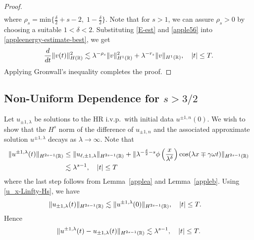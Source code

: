 \begin{proof}
\begin{equation}
\begin{split}
\label{apple56}
\end{split}
\end{equation}
%
%
where $\rho_s = \text{min} \Big\{ \frac{\delta}{2} + s -2, \; 1-
\frac{\delta}{2} \Big\}$.  Note that for $s>1$, we can assure $\rho_s > 0$
by choosing a suitable $1<\delta<2$.
Substituting \eqref{E-est} and \eqref{apple56} into \eqref{appleenergy-estimate-best},
we get
%
%
\begin{equation}
\label{apple58}
\frac{d}{dt} \|v(t)\|_{H(\mathbb{R})}^2 \lesssim \lambda^{-\rho_s}
\|v\|_{H^1(\mathbb{R})}^2 + \lambda^{-r_s}
\|v \|_{H^1(\mathbb{R})}, \quad |t| \le T.
\end{equation}
%
%
Applying Gronwall's inequality completes the proof. 
\end{proof}
%
%
%
%
\subsection{Non-Uniform Dependence for $s>3/2$}
Let $u_{\pm 1,\lambda}$ be solutions to the HR i.v.p.\ with initial 
data $u^{\pm 1,
n}(0)$. We wish to show that the $H^s$ norm of the difference of $u_{\pm 1,
n}$ and the associated approximate solution $u^{\pm 1,\lambda}$
decays as $\lambda \to \infty$. Note that
%
%
\begin{equation*}
\begin{split}
\label{apple62}
\|u^{\pm 1, \lambda}(t)\|_{H^{2s-1}(\mathbb{R})}
& \le \|u_{\ell, \pm 1, \lambda}\|_{H^{2s-1}(\mathbb{R})} +
\| \lambda^{-\frac{\delta}{2} -s} \phi \left(
\frac{x}{\lambda^\delta} \right) \cos(\lambda x \mp \gamma \omega t)
\|_{H^{2s-1}(\mathbb{R})}
\\
& \lesssim \lambda^{s-1}, \quad |t| \le T
\end{split}
\end{equation*}
%
%
where the last step follows from Lemma~\ref{applea} and Lemma~\ref{appleb}.
Using \eqref{u_x-Linfty-Hs}, we have 
%
\begin{equation*}
\begin{split}
\|u_{\pm 1,\lambda} (t) \|_{H^{2s-1}(\mathbb{R})}
& \lesssim  \|u^{\pm 1,\lambda}(0) \|_{H^{2s-1}(\mathbb{R})}, \quad
|t| \le T.
\label{apple60}
\end{split}
\end{equation*}
%
%
%
%
Hence
%
\begin{equation}
\begin{split}
\|u^{\pm 1, \lambda}(t) - u_{\pm 1, \lambda}(t) \|_{H^{2s-1}(\mathbb{R})}
\lesssim \lambda^{s-1}, \quad |t| \le T.
\label{apple63}
\end{split}
\end{equation}
